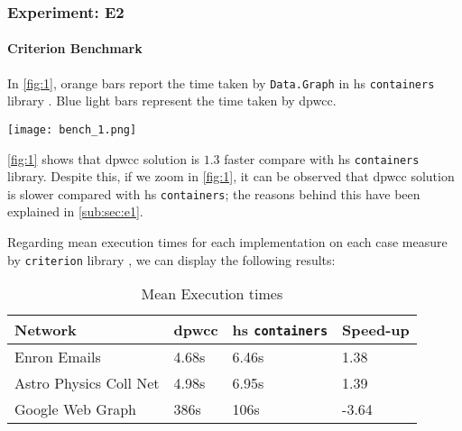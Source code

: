\subsubsection{Experiment: E2}
\paragraph{Criterion Benchmark}
In \autoref{fig:1}, orange bars report the time taken by \texttt{Data.Graph} in \acrshort{hs} \texttt{containers} library \cite{containers}. Blue light bars represent the time taken by \acrshort{dpwcc}.

\begin{minipage}[t]{\linewidth}
  \texttt{[image: bench\_1.png]}
  \captionsetup{type=figure}
  \label{fig:1}
\end{minipage}

\autoref{fig:1} shows that \acrshort{dpwcc} solution is $1.3$ faster compare with \acrshort{hs} \texttt{containers} library. Despite this, if we zoom  in \autoref{fig:1}, it can be observed that \acrshort{dpwcc} solution is slower compared with \acrshort{hs} \texttt{containers}; the reasons behind this have been explained in \autoref{sub:sec:e1}.
\iffalse
\begin{minipage}[t]{\linewidth}
  \texttt{[image: bench\_2]}
  \captionsetup{type=figure}
  \captionof{figure}{Benchmark 2 - DP in Haskell vs. Data.Graph Haskell}
  \label{fig:2}
\end{minipage}
\fi

Regarding mean execution times for each implementation on each case measure by \texttt{criterion} library \cite{criterion}, we can display the following results:

\begin{table}[H]
  \centering
  \begin{tabular}{|l|l|l|l|}
   \hline
   \textbf{Network} & \textbf{\acrshort{dpwcc}} & \textbf{\acrshort{hs} \texttt{containers}} & \textbf{Speed-up}\\
   \hline
   Enron Emails & 4.68s &  6.46s & 1.38\\
   \hline
   Astro Physics Coll Net & 4.98s & 6.95s  & 1.39\\
   \hline
   Google Web Graph & 386s & 106s & -3.64\\
   \hline
  \end{tabular}
 \caption{Mean Execution times}
 \label{table:6}
 \end{table}

